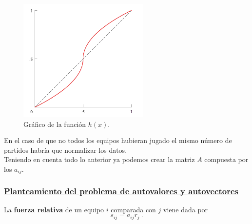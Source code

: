 \begin{figure}[htb]
	\centering
	\includegraphics{images/funcion_keener.png}
	\caption{Gráfico de la función $h(x)$.} \label{fig:func_skew}
\end{figure}

En el caso de que no todos los equipos hubieran jugado el mismo número de partidos habría que normalizar los datos.\\

Teniendo en cuenta todo lo anterior ya podemos crear la matriz $A$ compuesta por los $a_{ij}$.

\subsubsection*{\underline{Planteamiento del problema de autovalores y autovectores}}
\begin{defi} 
	La \textbf{fuerza relativa} de un equipo $i$ comparada con $j$ viene dada por
	\begin{equation}
		s_{ij} = a_{ij}r_{j} \ .
	\end{equation}
\end{defi}

